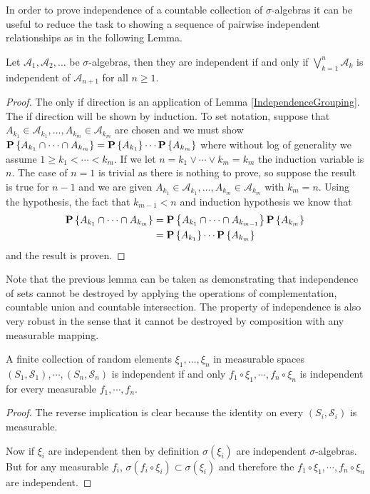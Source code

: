 In order to prove independence of a countable collection of
$\sigma$-algebras it can be useful to reduce the task to showing a
sequence of pairwise independent relationships as in the following
Lemma.
\begin{lem}\label{IndependenceByPairwiseIndependence}Let
  $\mathcal{A}_1, \mathcal{A}_2, \dotsc$ be $\sigma$-algebras, then
  they are independent if and only if $\bigvee_{k=1}^n \mathcal{A}_k$
  is independent of $\mathcal{A}_{n+1}$ for all $n \geq 1$.
\end{lem}
\begin{proof}
The only if direction is an application of Lemma
\ref{IndependenceGrouping}.  The if direction will be shown by
induction.  To set notation, suppose that $A_{k_1} \in
\mathcal{A}_{k_1}, \dotsc, A_{k_m} \in \mathcal{A}_{k_m}$ are chosen
and we must show $\textbf{P}\left \{A_{k_1} \cap \dotsb \cap A_{k_m} \right \} = 
\textbf{P}\left \{A_{k_1}  \right \} \dotsb \textbf{P}\left \{ A_{k_m} \right \} $ where without
log of generality we assume $1 \geq k_1 < \dotsb < k_m$.  If we let $n
= k_1 \vee \dotsb \vee k_m=k_m$ the induction variable is $n$.  The case
of $n=1$ is trivial as there is nothing to prove, so suppose the
result is true for $n-1$ and we are given $A_{k_1} \in
\mathcal{A}_{k_1}, \dotsc, A_{k_m} \in \mathcal{A}_{k_m}$ with $k_m =
n$.  Using the hypothesis, the fact that $k_{m-1} < n$ and induction
hypothesis we know that 
\begin{align*}
\textbf{P}\left \{A_{k_1} \cap \dotsb \cap A_{k_m} \right \} &= \textbf{P}\left \{A_{k_1}
  \cap \dotsb \cap A_{k_{m-1}} \right \} \textbf{P}\left \{A_{k_m} \right \} \\
&=\textbf{P}\left \{A_{k_1} \right \} \dotsb \textbf{P}\left \{A_{k_m} \right \}
\end{align*}
and the result is proven.
\end{proof}

Note that the previous lemma can be taken as demonstrating that
independence of sets cannot be destroyed by applying the operations of
complementation, countable union and countable intersection.  The
property of independence is also very robust in the sense that it
cannot be destroyed by composition with any measurable mapping.
\begin{lem}\label{IndependenceComposition}A
  finite collection of random elements $\xi_1, \dots, \xi_n$ in
  measurable spaces $(S_1,\mathcal{S}_1), \cdots, (S_n,
  \mathcal{S}_n)$ is independent if and only $f_1 \circ \xi_1, \cdots,
  f_n \circ \xi_n$ is independent for every measurable $f_1, \cdots, f_n$.
\end{lem}
\begin{proof}The reverse implication is clear because the identity on
  every $(S_i, \mathcal{S}_i)$ is measurable.

Now if $\xi_i$ are independent then by definition $\sigma(\xi_i)$ are
independent $\sigma$-algebras.  But for any measurable $f_i$, $\sigma(f_i \circ \xi_i) \subset
\sigma(\xi_i)$ and therefore the $f_1 \circ \xi_1, \cdots,
  f_n \circ \xi_n$ are independent.
\end{proof}

